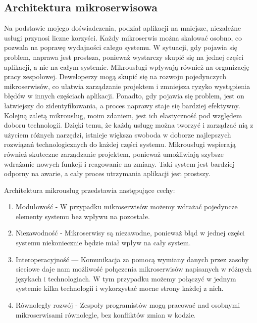 \documentclass[runningheads,12pt]{llncs}
\begin{document}
\subsection{Architektura mikroserwisowa}

Na podstawie mojego doświadczenia, podział aplikacji na mniejsze, niezależne usługi przynosi liczne korzyści. Każdy mikroserwis można skalować osobno, co pozwala na poprawę wydajności całego systemu. W sytuacji, gdy pojawia się problem, naprawa jest prostsza, ponieważ wystarczy skupić się na jednej części aplikacji, a nie na całym systemie. Mikrousługi wpływają również na organizację pracy zespołowej. Deweloperzy mogą skupić się na rozwoju pojedynczych mikroserwisów, co ułatwia zarządzanie projektem i zmniejsza ryzyko wystąpienia błędów w innych częściach aplikacji. Ponadto, gdy pojawia się problem, jest on łatwiejszy do zidentyfikowania, a proces naprawy staje się bardziej efektywny. Kolejną zaletą mikrousług, moim zdaniem, jest ich elastyczność pod względem doboru technologii. Dzięki temu, że każdą usługę można tworzyć i zarządzać nią z użyciem różnych narzędzi, istnieje większa swoboda w doborze najlepszych rozwiązań technologicznych do każdej części systemu. Mikrousługi wspierają również skuteczne zarządzanie projektem, ponieważ umożliwiają szybsze wdrażanie nowych funkcji i reagowanie na zmiany. Taki system jest bardziej odporny na awarie, a cały proces utrzymania aplikacji jest prostszy. ~\cite[p. 2]{newman2015building}

Architektura mikrousług przedstawia następujące cechy:

\begin{enumerate}
    \item Modułowość - W przypadku mikroserwisów możemy wdrażać pojedyncze elementy systemu bez wpływu na pozostałe.
    \item Niezawodność - Mikroserwisy są niezawodne, ponieważ błąd w jednej części systemu niekoniecznie będzie miał wpływ na cały system.
    \item Interoperacyjność — Komunikacja za pomocą wymiany danych przez zasoby sieciowe daje nam możliwość połączenia mikroserwisów napisanych w różnych językach i technologiach. W tym przypadku możemy połączyć w jednym systemie kilka technologii i wykorzystać mocne strony każdej z nich.
    \item Równoległy rozwój - Zespoły programistów mogą pracować nad osobnymi mikroserwisami równolegle, bez konfliktów zmian w kodzie.
\end{enumerate}
\end{document}

